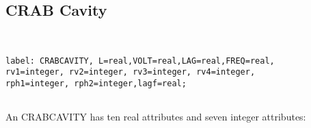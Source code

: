 



\subsection{CRAB Cavity}
\begin{verbatim}


label: CRABCAVITY, L=real,VOLT=real,LAG=real,FREQ=real,
rv1=integer, rv2=integer, rv3=integer, rv4=integer, 
rph1=integer, rph2=integer,lagf=real;
                  

\end{verbatim} An CRABCAVITY has ten real attributes and seven integer attributes: 
